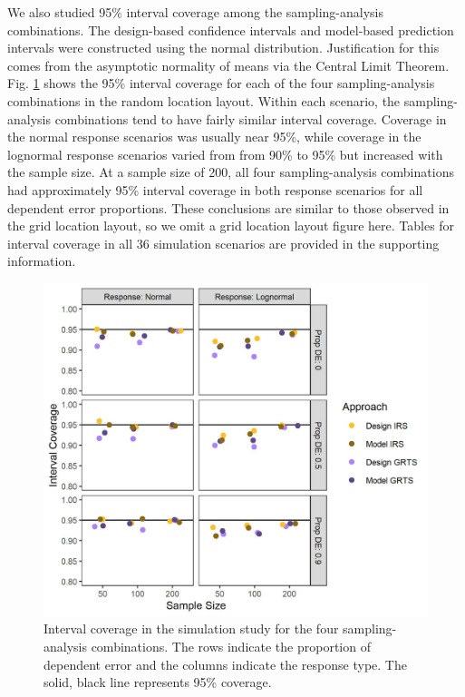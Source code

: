 \documentclass[]{elsarticle} %
\begin{document}
We also studied 95\% interval coverage among the sampling-analysis
combinations. The design-based confidence intervals and model-based
prediction intervals were constructed using the normal distribution.
Justification for this comes from the asymptotic normality of means via
the Central Limit Theorem. Fig. \ref{fig:figconf} shows the 95\%
interval coverage for each of the four sampling-analysis combinations in
the random location layout. Within each scenario, the sampling-analysis
combinations tend to have fairly similar interval coverage. Coverage in
the normal response scenarios was usually near 95\%, while coverage in
the lognormal response scenarios varied from from 90\% to 95\% but
increased with the sample size. At a sample size of 200, all four
sampling-analysis combinations had approximately 95\% interval coverage
in both response scenarios for all dependent error proportions. These
conclusions are similar to those observed in the grid location layout,
so we omit a grid location layout figure here. Tables for interval
coverage in all 36 simulation scenarios are provided in the supporting
information.

\begin{figure}
  \centering
  \includegraphics[width = 1\linewidth]{figures/coverage.jpeg}
  \caption{Interval coverage in the simulation study for the four sampling-analysis combinations. The rows indicate the proportion of dependent error and the columns indicate the response type. The solid, black line represents 95\% coverage.}
  \label{fig:figconf}
\end{figure}
\end{document}
